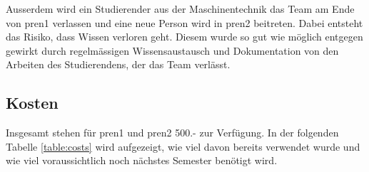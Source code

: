 Ausserdem wird ein Studierender aus der Maschinentechnik das Team am Ende von \acrshort{pren1} verlassen und eine neue Person wird in \acrshort{pren2} beitreten. Dabei entsteht das Risiko, dass Wissen verloren geht. Diesem wurde so gut wie möglich entgegen gewirkt durch regelmässigen Wissensaustausch und Dokumentation von den Arbeiten des Studierendens, der das Team verlässt.

\subsection{Kosten}\label{kosten}

Insgesamt stehen für \acrshort{pren1} und \acrshort{pren2} 500.- zur Verfügung. In der folgenden Tabelle \ref{table:costs} wird aufgezeigt, wie viel davon bereits verwendet wurde und wie viel voraussichtlich noch nächstes Semester benötigt wird.

